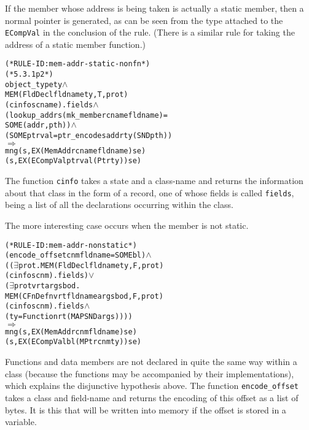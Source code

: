 \documentclass[11pt]{article}
\begin{document}
If the member whose address is being taken is actually a static
member, then a normal pointer is generated, as can be seen from the
type attached to the \texttt{ECompVal} in the conclusion of the rule.
(There is a similar rule for taking the address of a static member
function.)
\begin{center}
%
\begin{minipage}{\textwidth}
\begin{alltt}
(* RULE-ID: mem-addr-static-nonfn *)
(* 5.3.1 p2 *)
     object_type ty \(\land\)
     MEM (FldDecl fldname ty, T, prot)
         (cinfo s cname).fields \(\land\)
     (lookup_addr s (mk_member cname fldname) =
        SOME (addr, pth)) \(\land\)
     (SOME ptrval = ptr_encode s addr ty (SND pth))
   \(\Rightarrow\)
     mng (s, EX (MemAddr cname fldname) se)
         (s, EX (ECompVal ptrval (Ptr ty)) se)
\end{alltt}
\end{minipage}
\end{center}
The function \texttt{cinfo} takes a state and a class-name and returns
the information about that class in the form of a record, one of whose
fields is called \texttt{fields}, being a list of all the declarations
occurring within the class.

\bigskip\noindent
The more interesting case occurs when the member is not static.
%
%
\begin{alltt}
(* RULE-ID: mem-addr-nonstatic *)
     (encode_offset cnm fldname = SOME bl) \(\land\)
     ((\(\exists\)prot. MEM (FldDecl fldname ty, F, prot)
                  (cinfo s cnm).fields) \(\lor\)
      (\(\exists\)prot v rt args bod.
          MEM (CFnDefn v rt fldname args bod, F, prot)
              (cinfo s cnm).fields \(\land\)
          (ty = Function rt (MAP SND args))))
   \(\Rightarrow\)
     mng (s, EX (MemAddr cnm fldname) se)
         (s, EX (ECompVal bl (MPtr cnm ty)) se)
\end{alltt}
Functions and data members are not declared in quite the same way
within a class (because the functions may be accompanied by their
implementations), which explains the disjunctive hypothesis above.
The function \texttt{encode_offset} takes a class and field-name and
returns the encoding of this offset as a list of bytes.  It is this
that will be written into memory if the offset is stored in a
variable.
\end{document}
